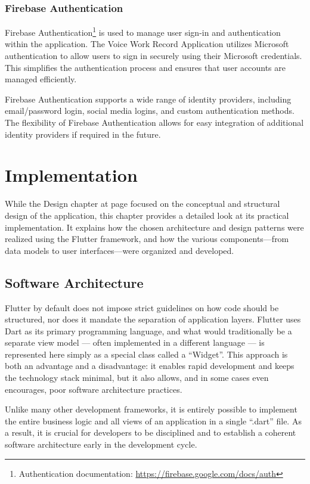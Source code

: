\documentclass[
  digital,     %
  oneside,     %
  nosansbold,  %
  nocolorbold, %
  lof,         %
  lot,         %
]{fithesis4}
\begin{document}
\subsection{Firebase Authentication}
Firebase Authentication\footnote{Authentication documentation: \url{https://firebase.google.com/docs/auth}} is used to manage user sign-in and authentication within the application. The Voice Work Record Application utilizes Microsoft authentication to allow users to sign in securely using their Microsoft credentials. This simplifies the authentication process and ensures that user accounts are managed efficiently.

Firebase Authentication supports a wide range of identity providers, including email/password login, social media logins, and custom authentication methods. The flexibility of Firebase Authentication allows for easy integration of additional identity providers if required in the future.

\chapter{Implementation}

While the Design chapter at page \pageref{chap:design} focused on the conceptual and structural design of the application, this chapter provides a detailed look at its practical implementation. It explains how the chosen architecture and design patterns were realized using the Flutter framework, and how the various components—from data models to user interfaces—were organized and developed.

\section{Software Architecture}
Flutter by default does not impose strict guidelines on how code should be structured, nor does it mandate the separation of application layers. Flutter uses Dart as its primary programming language, and what would traditionally be a separate view model --- often implemented in a different language --- is represented here simply as a special class called a ``Widget''. This approach is both an advantage and a disadvantage: it enables rapid development and keeps the technology stack minimal, but it also allows, and in some cases even encourages, poor software architecture practices.

Unlike many other development frameworks, it is entirely possible to implement the entire business logic and all views of an application in a single ``.dart'' file. As a result, it is crucial for developers to be disciplined and to establish a coherent software architecture early in the development cycle.
\end{document}
